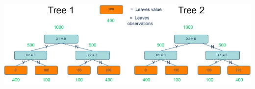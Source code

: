 \documentclass[12pt,a4paper]{article}
\let\origfigure\figure
\let\endorigfigure\endfigure
\renewenvironment{figure}[1][2] {
    \expandafter\origfigure\expandafter[H]
} {
    \endorigfigure
}
\begin{document}
\begin{figure}
\includegraphics[height = 20cm, width = \linewidth]{./includes/SHAP_bias.pdf}
    \caption{Diagram of the two tree versions of the simple model $Y = 100 \times X_1 + 100 \times X_1$. The values with a green number representing the subset of the dataset at a given split while the numbers in the leave nodes representing the value of the leaves.}
    \label{fig:tree_shap_bias}
\end{figure}
\end{document}
